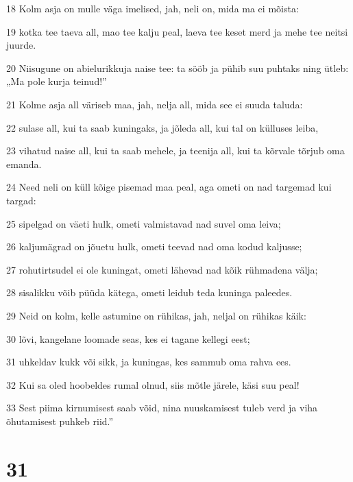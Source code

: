 \par 18 Kolm asja on mulle väga imelised, jah, neli on, mida ma ei mõista:
\par 19 kotka tee taeva all, mao tee kalju peal, laeva tee keset merd ja mehe tee neitsi juurde.
\par 20 Niisugune on abielurikkuja naise tee: ta sööb ja pühib suu puhtaks ning ütleb: „Ma pole kurja teinud!”
\par 21 Kolme asja all väriseb maa, jah, nelja all, mida see ei suuda taluda:
\par 22 sulase all, kui ta saab kuningaks, ja jõleda all, kui tal on külluses leiba,
\par 23 vihatud naise all, kui ta saab mehele, ja teenija all, kui ta kõrvale tõrjub oma emanda.
\par 24 Need neli on küll kõige pisemad maa peal, aga ometi on nad targemad kui targad:
\par 25 sipelgad on väeti hulk, ometi valmistavad nad suvel oma leiva;
\par 26 kaljumägrad on jõuetu hulk, ometi teevad nad oma kodud kaljusse;
\par 27 rohutirtsudel ei ole kuningat, ometi lähevad nad kõik rühmadena välja;
\par 28 sisalikku võib püüda kätega, ometi leidub teda kuninga paleedes.
\par 29 Neid on kolm, kelle astumine on rühikas, jah, neljal on rühikas käik:
\par 30 lõvi, kangelane loomade seas, kes ei tagane kellegi eest;
\par 31 uhkeldav kukk või sikk, ja kuningas, kes sammub oma rahva ees.
\par 32 Kui sa oled hoobeldes rumal olnud, siis mõtle järele, käsi suu peal!
\par 33 Sest piima kirnumisest saab võid, nina nuuskamisest tuleb verd ja viha õhutamisest puhkeb riid.”

\chapter{31}

